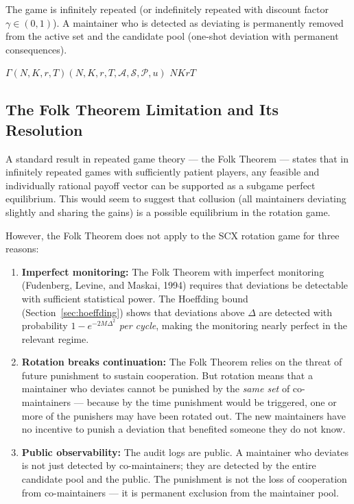 \documentclass[12pt,a4paper]{article}
\theoremstyle{remark}
\begin{document}
The game is infinitely repeated (or indefinitely repeated with discount factor
$\gamma \in (0, 1)$). A maintainer who is detected as deviating is permanently
removed from the active set and the candidate pool (one-shot deviation with
permanent consequences).

\noindent\textbf{}
$\Gamma(N, K, r, T)$$(N, K, r, T, \mathcal{A}, \mathcal{S}, \mathcal{P}, u)$
$N$$K$$r$$T$


\subsection{The Folk Theorem Limitation and Its Resolution}

A standard result in repeated game theory — the Folk Theorem — states that in
infinitely repeated games with sufficiently patient players, any feasible and
individually rational payoff vector can be supported as a subgame perfect
equilibrium. This would seem to suggest that collusion (all maintainers deviating
slightly and sharing the gains) is a possible equilibrium in the rotation game.

However, the Folk Theorem does not apply to the SCX rotation game for three
reasons:

\begin{enumerate}[label=(\arabic*), leftmargin=*]
    \item \textbf{Imperfect monitoring:} The Folk Theorem with imperfect
          monitoring (Fudenberg, Levine, and Maskai, 1994) requires that
          deviations be detectable with sufficient statistical power. The
          Hoeffding bound (Section~\ref{sec:hoeffding}) shows that deviations
          above $\Delta$ are detected with probability $1 - e^{-2M\Delta^2}$
          \textit{per cycle}, making the monitoring nearly perfect in the
          relevant regime.
    \item \textbf{Rotation breaks continuation:} The Folk Theorem relies on
          the threat of future punishment to sustain cooperation. But rotation
          means that a maintainer who deviates cannot be punished by the
          \textit{same set} of co-maintainers — because by the time punishment
          would be triggered, one or more of the punishers may have been rotated
          out. The new maintainers have no incentive to punish a deviation that
          benefited someone they do not know.
    \item \textbf{Public observability:} The audit logs are public. A
          maintainer who deviates is not just detected by co-maintainers; they
          are detected by the entire candidate pool and the public. The
          punishment is not the loss of cooperation from co-maintainers — it is
          permanent exclusion from the maintainer pool.
\end{enumerate}
\end{document}
